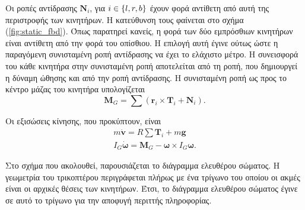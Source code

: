 Οι ροπές αντίδρασης \(\mathbf{N}_i\), για \(i\in\set{l, r, b}\) έχουν φορά
αντίθετη από αυτή της περιστροφής των κινητήρων. Η κατεύθυνση τους φαίνεται στο
σχήμα (\ref{fig:static_fbd}). Όπως παρατηρεί κανείς, η φορά των δύο εμπρόσθιων 
κινητήρων είναι αντίθετη από την φορά του οπίσθιου. Η επιλογή αυτή έγινε ούτως 
ώστε η παραγόμενη συνισταμένη ροπή αντίδρασης να έχει το ελάχιστο μέτρο. Η 
συνεισφορά του κάθε κινητήρα στην συνισταμένη ροπή αποτελείται από τη ροπή, που 
δημιουργεί η δύναμη ώθησης και από την ροπή αντίδρασης. Η συνισταμένη ροπή ως 
προς το κέντρο μάζας του κινητήρα υπολογίζεται
\begin{equation}
    \mathbf{M}_G  =  \sum(\mathbf{r}_i \times \mathbf{T}_i + \mathbf{N}_i).
\end{equation}

Οι εξισώσεις κίνησης, που προκύπτουν, είναι
\begin{gather}
    m \mathbf{{\dot v}} = R \sum \mathbf{T}_i + m\mathbf{g}\label{knt:trans} \\ 
    I_G \dot{\bm{\omega}} = \mathbf{M}_G - \bm{\omega}\times{I_G\bm{\omega}}.
    \label{knt:rot}
\end{gather}

Στο σχήμα που ακολουθεί, παρουσιάζεται το διάγραμμα ελευθέρου σώματος. Η
γεωμετρία του τρικοπτέρου περιγράφεται πλήρως με ένα τρίγωνο του οποίου οι ακμές
είναι οι αρχικές θέσεις των κινητήρων. Έτσι, το διάγραμμα ελευθέρου σώματος 
έγινε σε αυτό το τρίγωνο για την αποφυγή περιττής πληροφορίας.

